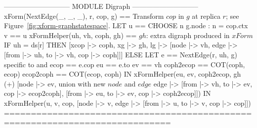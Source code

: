 \documentclass{article}
\begin{document}
\begin{tla}
----------------------------- MODULE Digraph -----------------------------
xForm(NextEdge(_, _, _), r, cop, g) == \* Transform $cop$ in $g$ at replica $r$; see Figure~\ref{fig:xform-graphstatespace}.
    LET u == CHOOSE n \in g.node : n = cop.ctx    v == u 
        xFormHelper(uh, vh, coph, gh) == \* $gh$: extra digraph produced in $xForm$
            IF uh = ds[r] THEN [xcop |-> coph, xg |-> gh,
                 lg |-> [node |-> {vh}, edge |-> {[from |-> uh, to |-> vh, cop |-> coph]}]] 
            ELSE LET e == NextEdge(r, uh, g) \* specific to \cjupiter{} and \xjupiter{}
                  ecop == e.cop    eu == e.to    ev == vh 
             coph2ecop == COT(coph, ecop)    ecop2coph == COT(ecop, coph)
                 IN  xFormHelper(eu, ev, coph2ecop,
                       gh (+) [node |-> {ev}, \* union with new $node$ and $edge$
                               edge |-> {[from |-> vh, to |-> ev, cop |-> ecop2coph],
                                         [from |-> eu, to |-> ev, cop |-> coph2ecop]}])
    IN xFormHelper(u, v, cop, [node |-> {v}, edge |-> {[from |-> u, to |-> v, cop |-> cop]}])  
=============================================================================
\end{tla}
\end{document}
